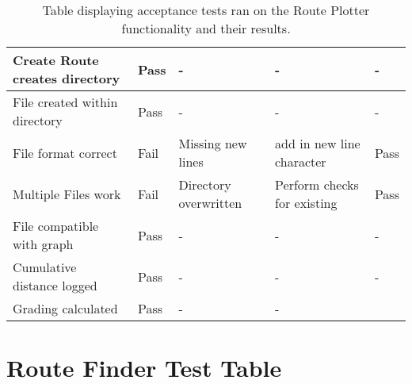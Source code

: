 \begin{table}[H]
\begin{tabular}{|l|l|l|l|l|}
Create Route creates directory   & Pass            & -                     & -                           & -             \\ \hline
File created within directory    & Pass            & -                     & -                           & -             \\ \hline
File format correct              & Fail            & Missing new lines     & add in new line character         & Pass          \\ \hline
Multiple Files work              & Fail            & Directory overwritten & Perform checks for existing & Pass          \\ \hline
File compatible with graph       & Pass            & -                     & -                           & -             \\ \hline
Cumulative distance logged       & Pass            & -                     & -                           & -             \\ \hline
Grading calculated               & Pass            & -                     & -                           &               \\ \hline
\end{tabular}
\caption[Route Plotter Tests]{Table displaying acceptance tests ran on the Route Plotter functionality and their results.}
\end{table}
\newpage	
\section{Route Finder Test Table}

